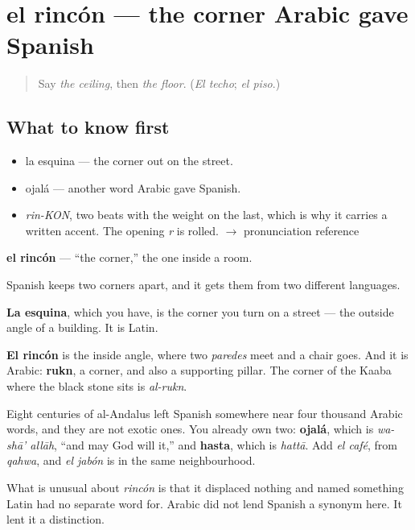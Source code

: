 \section[el rincón]{el rincón — the corner Arabic gave Spanish}

\label{lesson:ES-C355-rincon}



\begin{quote}
Say \emph{the ceiling}, then \emph{the floor}. (\emph{El techo}; \emph{el piso}.)
\end{quote}

\subsection*{What to know first}
\begin{itemize}
\raggedright
  \item la esquina — the corner out on the street.
  \item ojalá — another word Arabic gave Spanish.
\end{itemize}

\begin{sounds}
\begin{itemize}
\raggedright
  \item \emph{rin-KON}, two beats with the weight on the last, which is why it carries a written accent. The opening \emph{r} is rolled. $\to$ pronunciation reference
\end{itemize}
\end{sounds}

\begin{cousinweb}
\textbf{el rincón} — \textquotedblleft{}the corner,\textquotedblright{} the one inside a room.

Spanish keeps two corners apart, and it gets them from two different languages.

\textbf{La esquina}, which you have, is the corner you turn on a street — the outside angle of a building. It is Latin.

\textbf{El rincón} is the inside angle, where two \emph{paredes} meet and a chair goes. And it is Arabic: \textbf{rukn}, a corner, and also a supporting pillar. The corner of the Kaaba where the black stone sits is \emph{al-rukn}.

Eight centuries of al-Andalus left Spanish somewhere near four thousand Arabic words, and they are not exotic ones. You already own two: \textbf{ojalá}, which is \emph{wa-shā' allāh}, \textquotedblleft{}and may God will it,\textquotedblright{} and \textbf{hasta}, which is \emph{hattā}. Add \emph{el café}, from \emph{qahwa}, and \emph{el jabón} is in the same neighbourhood.

What is unusual about \emph{rincón} is that it displaced nothing and named something Latin had no separate word for. Arabic did not lend Spanish a synonym here. It lent it a distinction.
\end{cousinweb}


